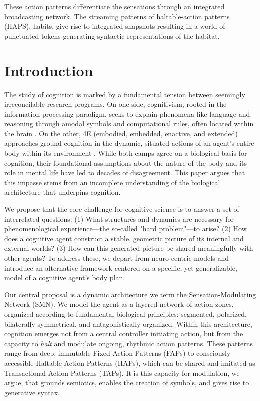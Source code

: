 \documentclass[10pt,letterpaper]{article}
\begin{document}
These action patterns differentiate the sensations through an
integrated broadcasting network.  The streaming patterns of
haltable-action patterns (HAPS), habits, give rise to integrated
snapshots resulting in a world of punctuated tokens generating
syntactic representations of the habitat.

\section{Introduction}
The study of cognition is marked by a fundamental tension between seemingly irreconcilable research programs. On one side, cognitivism, rooted in the information processing paradigm, seeks to explain phenomena like language and reasoning through amodal symbols and computational rules, often located within the brain \cite{chomsky1965aspects, fodor_modularity_1983}. On the other, 4E (embodied, embedded, enactive, and extended) approaches ground cognition in the dynamic, situated actions of an agent's entire body within its environment \cite{varela, noe_action_2004}. While both camps agree on a biological basis for cognition, their foundational assumptions about the nature of the body and its role in mental life have led to decades of disagreement. This paper argues that this impasse stems from an incomplete understanding of the biological architecture that underpins cognition.

We propose that the core challenge for cognitive science is to answer a set of interrelated questions: (1) What structures and dynamics are necessary for phenomenological experience—the so-called "hard problem"—to arise? (2) How does a cognitive agent construct a stable, geometric picture of its internal and external worlds? (3) How can this generated picture be shared meaningfully with other agents? To address these, we depart from neuro-centric models and introduce an alternative framework centered on a specific, yet generalizable, model of a cognitive agent's body plan.

Our central proposal is a dynamic architecture we term the Sensation-Modulating Network (SMN). We model the agent as a layered network of action zones, organized according to fundamental biological principles: segmented, polarized, bilaterally symmetrical, and antagonistically organized. Within this architecture, cognition emerges not from a central controller initiating action, but from the capacity to \textit{halt} and modulate ongoing, rhythmic action patterns. These patterns range from deep, immutable Fixed Action Patterns (FAPs) to consciously accessible Haltable Action Patterns (HAPs), which can be shared and imitated as Transactional Action Patterns (TAPs). It is this capacity for modulation, we argue, that grounds semiotics, enables the creation of symbols, and gives rise to generative syntax.
\end{document}
